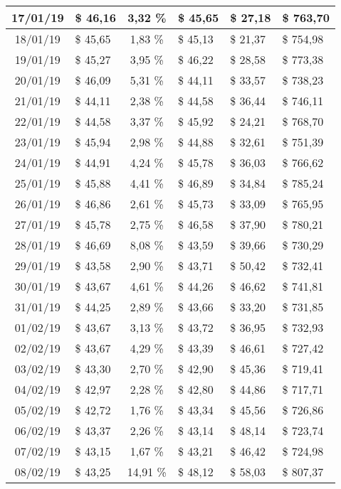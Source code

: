 \begin{center}
\begin{small}
\begin{longtable}{|c|l|c|l|l|l|}
17/01/19 & \$ 46,16 & 3,32 \% & \$ 45,65 & \$ 27,18 & \$ 763,70 \\ \hline
18/01/19 & \$ 45,65 & 1,83 \% & \$ 45,13 & \$ 21,37 & \$ 754,98 \\ \hline
19/01/19 & \$ 45,27 & 3,95 \% & \$ 46,22 & \$ 28,58 & \$ 773,38 \\ \hline
20/01/19 & \$ 46,09 & 5,31 \% & \$ 44,11 & \$ 33,57 & \$ 738,23 \\ \hline
21/01/19 & \$ 44,11 & 2,38 \% & \$ 44,58 & \$ 36,44 & \$ 746,11 \\ \hline
22/01/19 & \$ 44,58 & 3,37 \% & \$ 45,92 & \$ 24,21 & \$ 768,70 \\ \hline
23/01/19 & \$ 45,94 & 2,98 \% & \$ 44,88 & \$ 32,61 & \$ 751,39 \\ \hline
24/01/19 & \$ 44,91 & 4,24 \% & \$ 45,78 & \$ 36,03 & \$ 766,62 \\ \hline
25/01/19 & \$ 45,88 & 4,41 \% & \$ 46,89 & \$ 34,84 & \$ 785,24 \\ \hline
26/01/19 & \$ 46,86 & 2,61 \% & \$ 45,73 & \$ 33,09 & \$ 765,95 \\ \hline
27/01/19 & \$ 45,78 & 2,75 \% & \$ 46,58 & \$ 37,90 & \$ 780,21 \\ \hline
28/01/19 & \$ 46,69 & 8,08 \% & \$ 43,59 & \$ 39,66 & \$ 730,29 \\ \hline
29/01/19 & \$ 43,58 & 2,90 \% & \$ 43,71 & \$ 50,42 & \$ 732,41 \\ \hline
30/01/19 & \$ 43,67 & 4,61 \% & \$ 44,26 & \$ 46,62 & \$ 741,81 \\ \hline
31/01/19 & \$ 44,25 & 2,89 \% & \$ 43,66 & \$ 33,20 & \$ 731,85 \\ \hline
01/02/19 & \$ 43,67 & 3,13 \% & \$ 43,72 & \$ 36,95 & \$ 732,93 \\ \hline
02/02/19 & \$ 43,67 & 4,29 \% & \$ 43,39 & \$ 46,61 & \$ 727,42 \\ \hline
03/02/19 & \$ 43,30 & 2,70 \% & \$ 42,90 & \$ 45,36 & \$ 719,41 \\ \hline
04/02/19 & \$ 42,97 & 2,28 \% & \$ 42,80 & \$ 44,86 & \$ 717,71 \\ \hline
05/02/19 & \$ 42,72 & 1,76 \% & \$ 43,34 & \$ 45,56 & \$ 726,86 \\ \hline
06/02/19 & \$ 43,37 & 2,26 \% & \$ 43,14 & \$ 48,14 & \$ 723,74 \\ \hline
07/02/19 & \$ 43,15 & 1,67 \% & \$ 43,21 & \$ 46,42 & \$ 724,98 \\ \hline
08/02/19 & \$ 43,25 & 14,91 \% & \$ 48,12 & \$ 58,03 & \$ 807,37 \\ \hline

\end{longtable}
\end{small}
\end{center}
